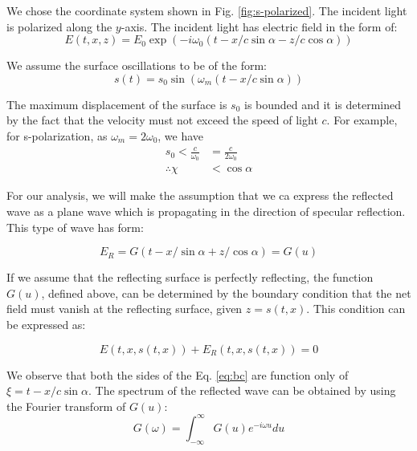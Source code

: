 We chose the coordinate system shown in Fig. \ref{fig:s-polarized}. The incident light is polarized along the $y$-axis. The incident light has electric field in the form of:
\begin{equation*}
    E(t, x, z) = E_0 \exp\left(-i\omega_0\left(t-x/c \sin\alpha - z/c \cos\alpha\right)\right)
\end{equation*}

We assume the surface oscillations to be of the form:
\begin{equation*}
    s(t) = s_0 \sin\left( \omega_m \left(t - x/c \sin\alpha\right) \right)
\end{equation*}

The maximum displacement of the surface is $s_0$ is bounded and it is determined by the fact that the velocity must not exceed the speed of light $c$. For example, for s-polarization, as $\omega_m = 2 \omega_0$, we have
\begin{align*}
    s_0 < \frac{c}{\omega_0} & = \frac{c}{2\omega_0} \\
    \therefore \chi          & < \cos\alpha
\end{align*}

For our analysis, we will make the assumption that we ca express the reflected wave as a plane wave which is propagating in the direction of specular reflection. This type of wave has form:

\begin{equation*}
    E_R = G(t - x/\sin\alpha + z/\cos\alpha) = G(u)
\end{equation*}

If we assume that the reflecting surface is perfectly reflecting, the function $G(u)$, defined above, can be determined by the boundary condition that the net field must vanish at the reflecting surface, given $z = s(t,x)$. This condition can be expressed as:

\begin{equation}
    \label{eq:bc}
    E(t,x,s(t,x)) + E_R(t,x,s(t,x)) = 0
\end{equation}

We observe that both the sides of the Eq. \ref{eq:bc} are function only of $\xi = t - x/c \sin\alpha$. The spectrum of the reflected wave can be obtained by using the Fourier transform of $G(u)$:
\begin{equation*}
    G(\omega) = \int_{-\infty}^{\infty} G(u) e^{-i\omega u} du
\end{equation*}

